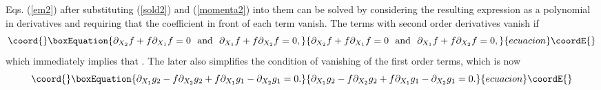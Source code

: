 \documentclass[a4paper,11pt]{article}
\begin{document}
Eqs. (\ref{em2}) after substituting (\ref{sold2}) and
(\ref{momenta2}) into them can be solved by considering the
resulting expression as a polynomial in derivatives and requiring
that the coefficient in front of each term vanish. The terms with
second order derivatives vanish if
\begin{equation}\coord{}\boxEquation{
\partial_{X_2}f + f\partial_{X_1}f=0 \ \ \mbox{and}  \ \
\partial_{X_1}f + f\partial_{X_2}f=0,
}{
\partial_{X_2}f + f\partial_{X_1}f=0 \ \ \mbox{and}  \ \
\partial_{X_1}f + f\partial_{X_2}f=0,
}{ecuacion}\coordE{}\end{equation}
which immediately implies that \coordHE{}. The later also
simplifies the condition of vanishing of the first order terms,
which is now
\begin{equation}\coord{}\boxEquation{
\partial_{X_1}g_2-f\partial_{X_2}g_2+f\partial_{X_1}g_1-\partial_{X_2}g_1=0.
\label{or1con}
}{
\partial_{X_1}g_2-f\partial_{X_2}g_2+f\partial_{X_1}g_1-\partial_{X_2}g_1=0.
}{ecuacion}\coordE{}\end{equation}
\end{document}
